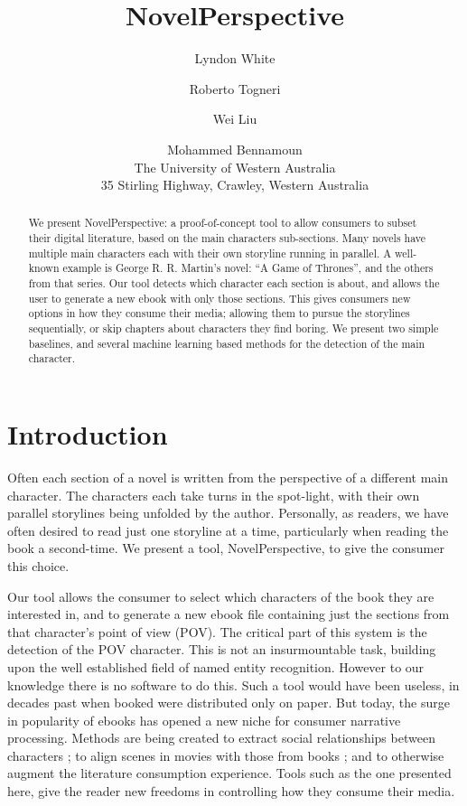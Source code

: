 \documentclass[11pt,a4paper]{article}
\title{NovelPerspective}
\author{Lyndon White %
	\and Roberto Togneri %
	\and Wei Liu %
	\and Mohammed Bennamoun %
	\\ 
	The University of Western Australia\\
	35 Stirling Highway, Crawley, Western Australia
}
\newcommand{\parencite}{\citep}
\begin{document}
\maketitle

\begin{abstract}
We present NovelPerspective: a proof-of-concept tool to allow consumers to subset their digital literature, based on the main characters sub-sections.
Many novels have multiple main characters each with their own storyline running in parallel.
A well-known example is George R. R. Martin's  novel: ``A Game of Thrones'', and the others from that series.
Our tool detects which character each section is about,
and allows the user to generate a new ebook with only those sections.
This gives consumers new options in how they consume their media; allowing them to  pursue the storylines sequentially, or skip chapters about characters they find boring.
We present two simple baselines, and several machine learning based methods for the detection of the main character.
\end{abstract}

\section{Introduction}
Often each section of a novel is written  from the perspective of a different main character.
The characters each take turns in the spot-light,
with their own parallel storylines being unfolded by the author.
Personally, as readers, we have often desired to read just one storyline at a time, particularly when reading the book a second-time.
We present a tool, NovelPerspective, to give the consumer this choice.

Our tool allows the consumer to select which characters of the book they are interested in,
and to generate a new ebook file containing just the sections from that character's point of view (POV).
The critical part of this system is the detection of the POV character.
This is not an insurmountable task, building upon the well established field of named entity recognition.
However to our knowledge there is no software to do this.
Such a tool would have been useless, in decades past when booked were distributed only on paper.
But today, the surge in popularity of ebooks has opened a new niche for consumer narrative processing.
Methods are being created to extract social relationships between characters \parencite{elson2010socialnetworks,wohlgenannt2016extracting};
to align scenes in movies with those from books \parencite{moviebook}; and to otherwise augment the literature consumption experience.
Tools such as the one presented here, give the reader new freedoms in controlling how they consume their media.
\end{document}
